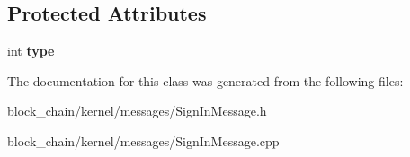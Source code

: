 \subsection*{Protected Attributes}
\begin{DoxyCompactItemize}
\item 
\mbox{\label{classMessage_afbfb481c98b13d0deba0bac443bebe29}} 
int {\bfseries type}
\end{DoxyCompactItemize}


The documentation for this class was generated from the following files\+:\begin{DoxyCompactItemize}
\item 
block\+\_\+chain/kernel/messages/Sign\+In\+Message.\+h\item 
block\+\_\+chain/kernel/messages/Sign\+In\+Message.\+cpp\end{DoxyCompactItemize}
